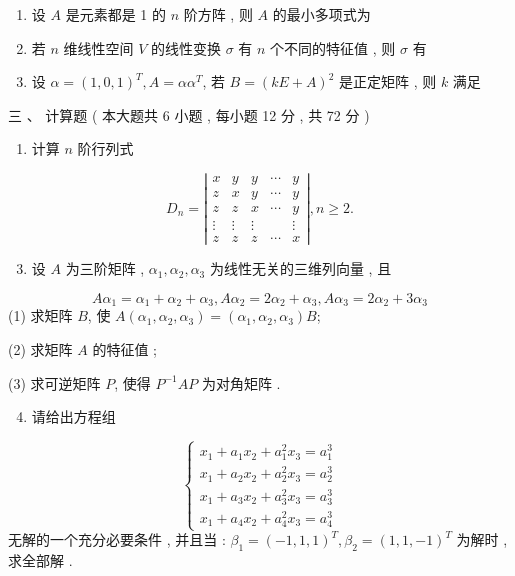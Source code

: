 \documentclass[10pt]{article}
\begin{document}
{\begin{enumerate}
  \item  设  $A$  是元素都是  1  的  $n$  阶方阵 ,  则  $A$  的最小多项式为 

  \item  若  $n$  维线性空间  $V$  的线性变换  $\sigma$  有  $n$  个不同的特征值 ,  则  $\sigma$  有 

  \item  设  $\alpha=(1,0,1)^{T}, A=\alpha \alpha^{T}$,  若  $B=(k E+A)^{2}$  是正定矩阵 ,  则  $k$  满足 

\end{enumerate}
 三 、 计算题 ( 本大题共  6  小题 ,  每小题  12  分 ,  共  72  分 )

\begin{enumerate}
  \item  计算  $n$  阶行列式 
\end{enumerate}
$$
D_{n}=\left|\begin{array}{ccccc}
x & y & y & \cdots & y \\
z & x & y & \cdots & y \\
z & z & x & \cdots & y \\
\vdots & \vdots & \vdots & & \vdots \\
z & z & z & \cdots & x
\end{array}\right|, n \geqslant 2 .
$$

\begin{enumerate}
  \setcounter{enumi}{2}
  \item  设  $A$  为三阶矩阵 , $\alpha_{1}, \alpha_{2}, \alpha_{3}$  为线性无关的三维列向量 ,  且 
\end{enumerate}
$$
A \alpha_{1}=\alpha_{1}+\alpha_{2}+\alpha_{3}, A \alpha_{2}=2 \alpha_{2}+\alpha_{3}, A \alpha_{3}=2 \alpha_{2}+3 \alpha_{3}
$$
(1)  求矩阵  $B$,  使  $A\left(\alpha_{1}, \alpha_{2}, \alpha_{3}\right)=\left(\alpha_{1}, \alpha_{2}, \alpha_{3}\right) B$;

(2)  求矩阵  $A$  的特征值 ;

(3)  求可逆矩阵  $P$,  使得  $P^{-1} A P$  为对角矩阵 .

\begin{enumerate}
  \setcounter{enumi}{3}
  \item  请给出方程组 
\end{enumerate}
$$
\left\{\begin{array}{l}
x_{1}+a_{1} x_{2}+a_{1}^{2} x_{3}=a_{1}^{3} \\
x_{1}+a_{2} x_{2}+a_{2}^{2} x_{3}=a_{2}^{3} \\
x_{1}+a_{3} x_{2}+a_{3}^{2} x_{3}=a_{3}^{3} \\
x_{1}+a_{4} x_{2}+a_{4}^{2} x_{3}=a_{4}^{3}
\end{array}\right.
$$
 无解的一个充分必要条件 ,  并且当 : $\beta_{1}=(-1,1,1)^{T}, \beta_{2}=(1,1,-1)^{T}$  为解时 ,  求全部解 .

}
\end{document}

